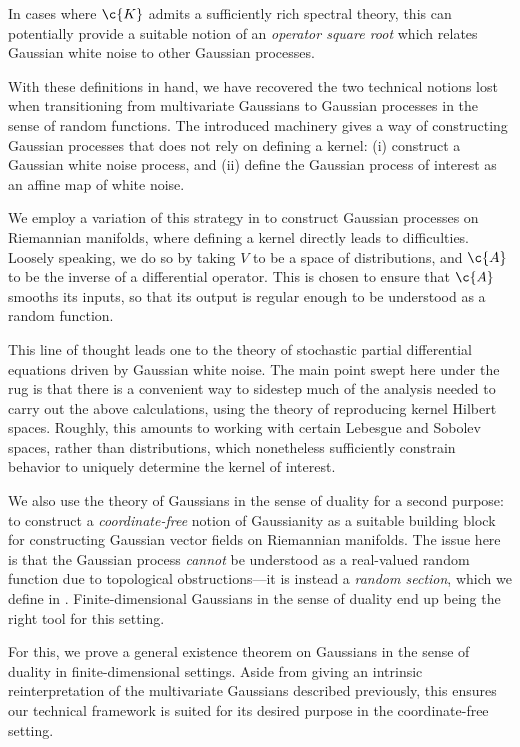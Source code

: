 \documentclass[11pt]{book}
\begin{document}
In cases where $\c{K}$ admits a sufficiently rich spectral theory, this can potentially provide a suitable notion of an \emph{operator square root} which relates Gaussian white noise to other Gaussian processes.


With these definitions in hand, we have recovered the two technical notions lost when transitioning from multivariate Gaussians to Gaussian processes in the sense of random functions.
The introduced machinery gives a way of constructing Gaussian processes that does not rely on defining a kernel: (i) construct a Gaussian white noise process, and (ii) define the Gaussian process of interest as an affine map of white noise.

We employ a variation of this strategy in  to construct Gaussian processes on Riemannian manifolds, where defining a kernel directly leads to difficulties.
Loosely speaking, we do so by taking $V$ to be a space of distributions, and $\c{A}$ to be the inverse of a differential operator.
This is chosen to ensure that $\c{A}$ smooths its inputs, so that its output is regular enough to be understood as a random function.

This line of thought leads one to the theory of stochastic partial differential equations driven by Gaussian white noise.
The main point swept here under the rug is that there is a convenient way to sidestep much of the analysis needed to carry out the above calculations, using the theory of reproducing kernel Hilbert spaces.
Roughly, this amounts to working with certain Lebesgue and Sobolev spaces, rather than distributions, which nonetheless sufficiently constrain behavior to uniquely determine the kernel of interest.

We also use the theory of Gaussians in the sense of duality for a second purpose: to construct a \emph{coordinate-free} notion of Gaussianity as a suitable building block for constructing Gaussian vector fields on Riemannian manifolds.
The issue here is that the Gaussian process \emph{cannot} be understood as a real-valued random function due to topological obstructions---it is instead a \emph{random section}, which we define in .
Finite-dimensional Gaussians in the sense of duality end up being the right tool for this setting.

For this, we prove a general existence theorem on Gaussians in the sense of duality in finite-dimensional settings.
Aside from giving an intrinsic reinterpretation of the multivariate Gaussians described previously, this ensures our technical framework is suited for its desired purpose in the coordinate-free setting.
\end{document}

